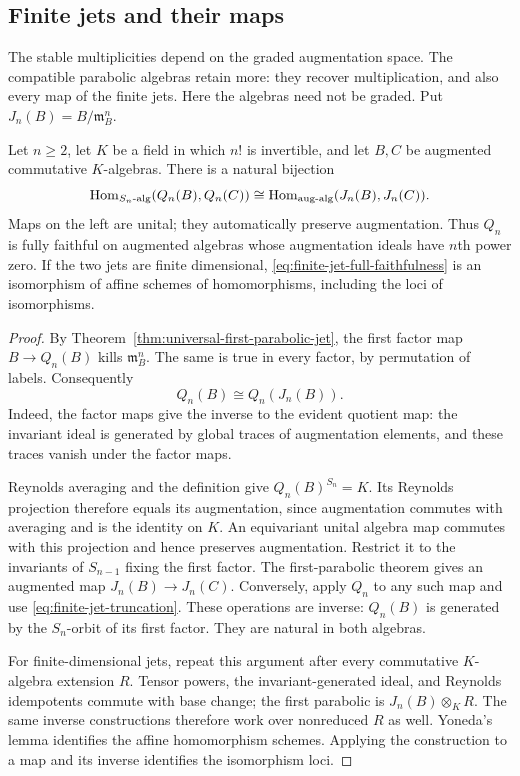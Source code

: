 \subsection{Finite jets and their maps}

The stable multiplicities depend on the graded augmentation space.
The compatible parabolic algebras retain more: they recover
multiplication, and also every map of the finite jets.  Here the
algebras need not be graded.  Put $J_n(B)=B/\mathfrak m_B^n$.

\begin{theorem}
\label{thm:finite-jet-full-faithfulness}
Let $n\ge2$, let $K$ be a field in which $n!$ is invertible, and
let $B,C$ be augmented commutative $K$-algebras.  There is a natural
bijection
\begin{equation}\label{eq:finite-jet-full-faithfulness}
 \operatorname{Hom}_{S_n\text{-alg}}(Q_n(B),Q_n(C))
 \cong
 \operatorname{Hom}_{\mathrm{aug}\text{-alg}}(J_n(B),J_n(C)).
\end{equation}
Maps on the left are unital; they automatically preserve augmentation.
Thus $Q_n$ is fully faithful on augmented algebras whose augmentation
ideals have $n$th power zero.  If the two jets are finite dimensional,
\eqref{eq:finite-jet-full-faithfulness} is an isomorphism of affine
schemes of homomorphisms, including the loci of isomorphisms.
\end{theorem}

\begin{proof}
By Theorem~\ref{thm:universal-first-parabolic-jet}, the first factor
map $B\to Q_n(B)$ kills $\mathfrak m_B^n$.  The same is true in
every factor, by permutation of labels.  Consequently
\begin{equation}\label{eq:finite-jet-truncation}
                         Q_n(B)\cong Q_n(J_n(B)).
\end{equation}
Indeed, the factor maps give the inverse to the evident quotient
map: the invariant ideal is generated by global traces of
augmentation elements, and these traces vanish under the factor
maps.

Reynolds averaging and the definition give $Q_n(B)^{S_n}=K$.
Its Reynolds projection therefore equals its augmentation, since
augmentation commutes with averaging and is the identity on $K$.
An equivariant unital algebra map commutes with this projection
and hence preserves augmentation.  Restrict it to the invariants
of $S_{n-1}$ fixing the first factor.  The first-parabolic theorem
gives an augmented map $J_n(B)\to J_n(C)$.  Conversely, apply
$Q_n$ to any such map and use \eqref{eq:finite-jet-truncation}.
These operations are inverse: $Q_n(B)$ is generated by the
$S_n$-orbit of its first factor.  They are natural in both algebras.

For finite-dimensional jets, repeat this argument after every
commutative $K$-algebra extension $R$.  Tensor powers, the
invariant-generated ideal, and Reynolds idempotents commute with
base change; the first parabolic is $J_n(B)\otimes_K R$.
The same inverse constructions therefore work over nonreduced
$R$ as well.  Yoneda's lemma identifies the affine homomorphism
schemes.  Applying the construction to a map and its inverse
identifies the isomorphism loci.
\end{proof}

